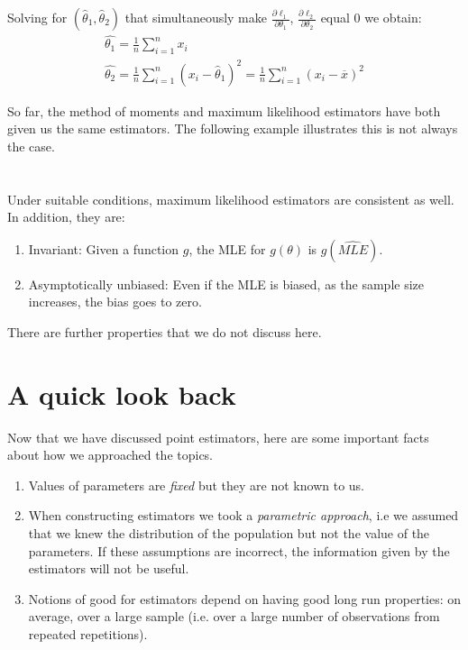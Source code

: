 {	Solving for $(\hat{\theta}_1, \hat{\theta}_2)$ that simultaneously make $\frac{\partial\ell_1}{\partial \theta_1}$, $\frac{\partial \ell_2}{\partial \theta_2}$ equal 0 we obtain:
	\begin{gather*}
		\hat{\theta_1} = \frac{1}{n} \sum_{i=1}^n x_i \\
		\hat{\theta_2} = \frac{1}{n} \sum_{i=1}^n (x_i - \hat{\theta}_1)^2 = \frac{1}{n} \sum_{i=1}^n (x_i - \overline{x})^2
	\end{gather*}
}

So far, the method of moments and maximum likelihood estimators have both given us the same estimators. The following example illustrates this is not always the case.


\section{}
Under suitable conditions, maximum likelihood estimators are consistent as well. In addition, they are:
\begin{enumerate}
	\item Invariant: Given a function $g$, the MLE for $g(\theta)$ is $g(\hat{MLE})$.
	\item Asymptotically unbiased: Even if the MLE is biased, as the sample size increases, the bias goes to zero.
\end{enumerate}

There are further properties that we do not discuss here.

\section{A quick look back}

Now that we have discussed point estimators, here are some important facts about how we approached the topics.

\begin{enumerate}
	\item Values of parameters are \textit{fixed} but they are not known to us.
	\item When constructing estimators we took a \textit{parametric approach}, i.e we assumed that we knew the distribution of the population but not the value of the parameters. If these assumptions are incorrect, the information given by the estimators will not be useful.
 \item Notions of good for estimators depend on having good long run properties: on average, over a large sample (i.e. over a large number of observations from repeated repetitions). 
\end{enumerate}



